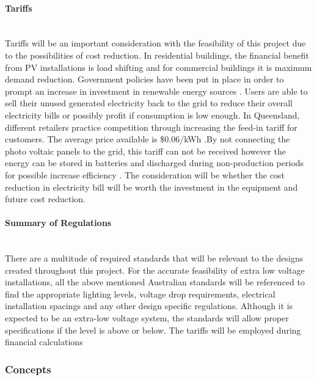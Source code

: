 \paragraph{Tariffs}
~\\
Tariffs will be an important consideration with the feasibility of this project due to the
possibilities of cost reduction. In residential buildings, the financial benefit from PV installations is load shifting and for commercial buildings it is maximum demand reduction. Government policies have been put in place in order to prompt an increase in investment in renewable energy sources \cite{Nelson2011}. Users are able to sell their unused generated electricity back to the grid to reduce their overall electricity bills or possibly profit if consumption is low enough. In Queensland, different retailers practice competition through increasing the feed-in tariff for customers. The average price available is \$0.06/kWh \cite{website:SolarChoice}.By not connecting the photo voltaic panels to the grid, this tariff can not be received however the energy can be stored in batteries and discharged during non-production periods for possible increase efficiency \cite{AntoniouATzimasARowland2015}. The consideration will be whether the cost reduction in electricity bill will be worth the investment in the equipment and future cost reduction. 

\paragraph{Summary of Regulations}
~\\ 
There are a multitude of required standards that will be relevant to the designs created throughout this project. For the accurate feasibility of extra low voltage installations, all the above mentioned Australian standards will be referenced to find the appropriate lighting levels, voltage drop requirements, electrical installation spacings and any other design specific regulations. Although it is expected to be an extra-low voltage system, the standards will allow proper specifications if the level is above or below. The tariffs will be employed during financial calculations     



\subsubsection{Concepts}

